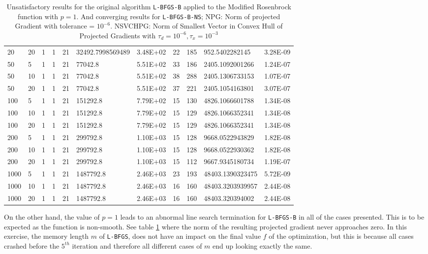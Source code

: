\begin{table}
\begin{center}
\begin{tabular}{|l|l|l|l|l|l|l|l|l|l|l|}
      20 & 20 & 1 & 1 & 21 & 32492.7998569489 & 3.48E+02 & 22 & 185 & 952.5402282145 & 3.28E-09\\
      50 & 5 & 1 & 1 & 21 & 77042.8 & 5.51E+02 & 33 & 186 & 2405.1092001266 & 1.24E-07\\
      50 & 10 & 1 & 1 & 21 & 77042.8 & 5.51E+02 & 38 & 288 & 2405.1306733153 & 1.07E-07\\
      50 & 20 & 1 & 1 & 21 & 77042.8 & 5.51E+02 & 37 & 221 & 2405.1054163801 & 3.07E-07\\
      100 & 5 & 1 & 1 & 21 & 151292.8 & 7.79E+02 & 15 & 130 & 4826.1066601788 & 1.34E-08\\
      100 & 10 & 1 & 1 & 21 & 151292.8 & 7.79E+02 & 15 & 129 & 4826.1066352341 & 1.34E-08\\
      100 & 20 & 1 & 1 & 21 & 151292.8 & 7.79E+02 & 15 & 129 & 4826.1066352341 & 1.34E-08\\
      200 & 5 & 1 & 1 & 21 & 299792.8 & 1.10E+03 & 15 & 128 & 9668.0522943829 & 1.82E-08\\
      200 & 10 & 1 & 1 & 21 & 299792.8 & 1.10E+03 & 15 & 128 & 9668.0522930362 & 1.82E-08\\
      200 & 20 & 1 & 1 & 21 & 299792.8 & 1.10E+03 & 15 & 112 & 9667.9345180734 & 1.19E-07\\
      1000 & 5 & 1 & 1 & 21 & 1487792.8 & 2.46E+03 & 23 & 193 & 48403.1390323475 & 5.72E-09\\
      1000 & 10 & 1 & 1 & 21 & 1487792.8 & 2.46E+03 & 16 & 160 & 48403.3203939957 & 2.44E-08\\
      1000 & 20 & 1 & 1 & 21 & 1487792.8 & 2.46E+03 & 16 & 160 & 48403.320394002 & 2.44E-08\\
      \hline
    \end{tabular}
    \caption[Modified Rosenbrock with $p = 1$]{Unsatisfactory results for the original algorithm \texttt{L-BFGS-B} applied to the Modified Rosenbrock function with $p = 1$. And converging results for \texttt{L-BFGS-B-NS}; NPG: Norm of projected Gradient with tolerance = $10^{-6}$. NSVCHPG: Norm of Smallest Vector in Convex Hull of Projected Gradients with $\tau_d = 10^{-6}, \tau_x = 10^{-3}$}
    \label{pequal1merged}
  \end{center}
\end{table}

On the other hand, the value of $p = 1$ leads to an abnormal line search termination for \texttt{L-BFGS-B} in all of the cases presented. This is to be expected as the function is non-smooth. See table \ref{pequal1merged} where the norm of the resulting projected gradient never approaches zero. In this exercise, the memory length $m$ of \texttt{L-BFGS}, does not have an impact on the final value $f$ of the optimization, but this is because all cases crashed before the $5^{th}$ iteration and therefore all different cases of $m$ end up looking exactly the same.

